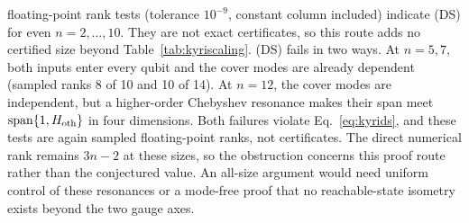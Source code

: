 floating-point rank tests (tolerance $10^{-9}$, constant column
included) indicate (DS) for even $n=2,\ldots,10$. They are not exact
certificates, so this route adds no certified size beyond
Table~\ref{tab:kyriscaling}. (DS) fails in two ways. At $n=5,7$, both
inputs enter every qubit and the cover modes are already dependent
(sampled ranks 8 of 10 and 10 of 14). At $n=12$, the cover modes are
independent, but a higher-order Chebyshev resonance makes their span
meet $\mathrm{span}\{1,H_{\rm oth}\}$ in four dimensions. Both
failures violate Eq.~\eqref{eq:kyrids}, and these tests are again
sampled floating-point ranks, not certificates. The direct numerical
rank remains $3n-2$ at these sizes,
so the obstruction concerns this proof route rather than the
conjectured value. An all-size argument would need uniform control of
these resonances or a mode-free proof that no reachable-state isometry
exists beyond the two gauge axes.
